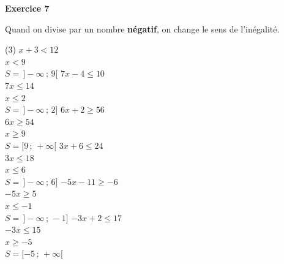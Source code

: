 \documentclass[a4paper,11pt]{article}
\newenvironment{exercice}[1]{%
  \Needspace{6\baselineskip}\par\bigskip\noindent\textbf{Exercice #1}\par\smallskip\noindent\ignorespaces
}{%
  \par
}
\begin{document}
\begin{exercice}{7}
Quand on divise par un nombre \textbf{négatif}, on change le sens de l'inégalité.
\begin{tasks}(3)
\task $x+3<12$\\ $x<9$\\ $S=\,]-\infty\,;\,9[$
\task $7x-4\leq 10$\\ $7x\leq 14$\\ $x\leq 2$\\ $S=\,]-\infty\,;\,2]$
\task $6x+2\geq 56$\\ $6x\geq 54$\\ $x\geq 9$\\ $S=[9\,;\,+\infty[$
\task $3x+6\leq 24$\\ $3x\leq 18$\\ $x\leq 6$\\ $S=\,]-\infty\,;\,6]$
\task $-5x-11\geq -6$\\ $-5x\geq 5$\\ $x\leq -1$\\ $S=\,]-\infty\,;\,-1]$
\task $-3x+2\leq 17$\\ $-3x\leq 15$\\ $x\geq -5$\\ $S=[-5\,;\,+\infty[$
\end{tasks}
\end{exercice}
\end{document}
